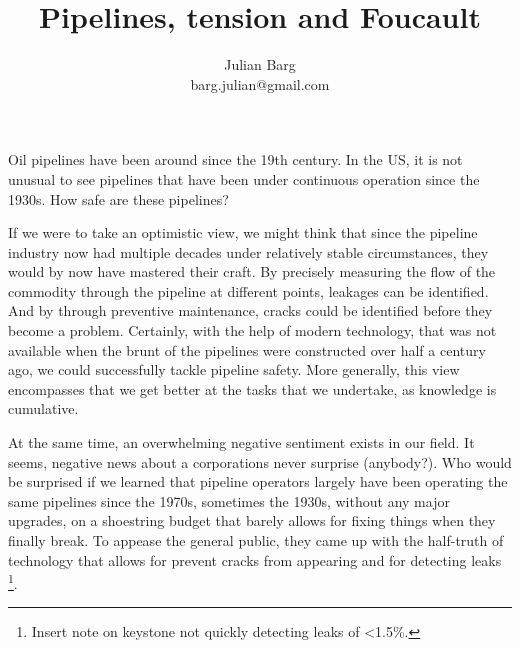 \documentclass[12pt, man, natbib]{apa6}
\title{Pipelines, tension and Foucault}
\author{Julian Barg\\barg.julian@gmail.com}
\affiliation{Ivey Business School}
\begin{document}
	
	\maketitle
	
	\singlespacing
	
	\section{}	

	Oil pipelines have been around since the 19th century. In the US, it is not unusual to see pipelines that have been under continuous operation since the 1930s. How safe are these pipelines? 
	
	If we were to take an optimistic view, we might think that since the pipeline industry now had multiple decades under relatively stable circumstances, they would by now have mastered their craft. By precisely measuring the flow of the commodity through the pipeline at different points, leakages can be identified. And by through preventive maintenance, cracks could be identified before they become a problem. Certainly, with the help of modern technology, that was not available when the brunt of the pipelines were constructed over half a century ago, we could successfully tackle pipeline safety. More generally, this view encompasses that we get better at the tasks that we undertake, as knowledge is cumulative.
	
	At the same time, an overwhelming negative sentiment exists in our field. It seems, negative news about a corporations never surprise (anybody?). Who would be surprised if we learned that pipeline operators largely have been operating the same pipelines since the 1970s, sometimes the 1930s, without any major upgrades, on a shoestring budget that barely allows for fixing things when they finally break. To appease the general public, they came up with the half-truth of technology that allows for prevent cracks from appearing and for detecting leaks \footnote{Insert note on keystone not quickly detecting leaks of <1.5\%.}.


\end{document}

